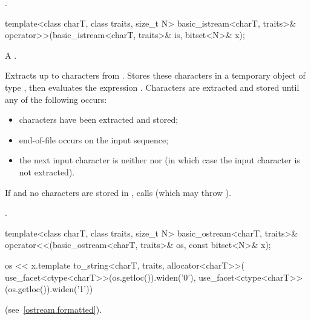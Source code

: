 \begin{itemdescr}
\pnum
\returns
{}.
\end{itemdescr}

%
\begin{itemdecl}
template<class charT, class traits, size_t N>
  basic_istream<charT, traits>&
    operator>>(basic_istream<charT, traits>& is, bitset<N>& x);
\end{itemdecl}

\begin{itemdescr}
\pnum
A .

\pnum
\effects
Extracts up to  characters from .
Stores these characters in a temporary object  of type
,
then evaluates the expression
.
Characters are extracted and stored until any of the following occurs:
\begin{itemize}
\item
{} characters have been extracted and stored;
\item
{}%
end-of-file occurs on the input sequence;
\item
the next input character is neither
nor
(in which case the input character is not extracted).
\end{itemize}

\pnum
If  and no characters are stored in , calls
(which may throw
).

\pnum
\returns
{}.
\end{itemdescr}

%
\begin{itemdecl}
template<class charT, class traits, size_t N>
  basic_ostream<charT, traits>&
    operator<<(basic_ostream<charT, traits>& os, const bitset<N>& x);
\end{itemdecl}

\begin{itemdescr}
\pnum
\returns
\begin{codeblock}
os << x.template to_string<charT, traits, allocator<charT>>(
  use_facet<ctype<charT>>(os.getloc()).widen('0'),
  use_facet<ctype<charT>>(os.getloc()).widen('1'))
\end{codeblock}
(see~\ref{ostream.formatted}).
\end{itemdescr}

